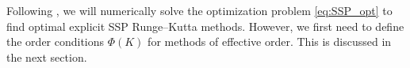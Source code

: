 Following \cite{Ketcheson2008, Ketcheson/Macdonald/Gottlieb:2009}, 
we will numerically solve the optimization problem \eqref{eq:SSP_opt} to find
optimal explicit SSP Runge--Kutta methods. 
However, we first need to define the order conditions $\Phi(K)$ for methods 
of effective order.
This is discussed in the next section.
